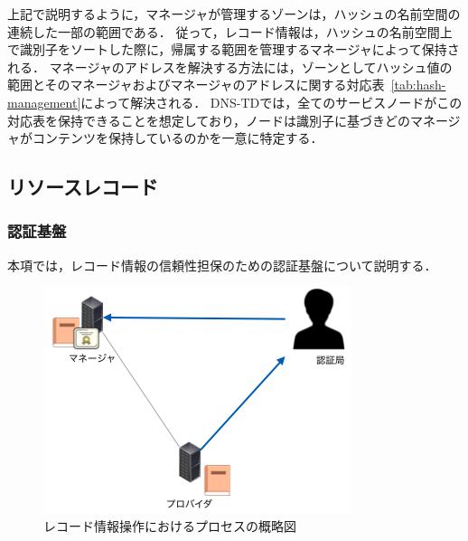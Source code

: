 上記で説明するように，マネージャが管理するゾーンは，ハッシュの名前空間の連続した一部の範囲である．
従って，レコード情報は，ハッシュの名前空間上で識別子をソートした際に，帰属する範囲を管理するマネージャによって保持される．
マネージャのアドレスを解決する方法には，ゾーンとしてハッシュ値の範囲とそのマネージャおよびマネージャのアドレスに関する対応表~\ref{tab:hash-management}によって解決される．
DNS-TDでは，全てのサービスノードがこの対応表を保持できることを想定しており，ノードは識別子に基づきどのマネージャがコンテンツを保持しているのかを一意に特定する．


\newpage
\subsection{リソースレコード}
\subsubsection{認証基盤}
\label{sec:certificate}
本項では，レコード情報の信頼性担保のための認証基盤について説明する．
\begin{figure}[h]
 \centering
 \includegraphics[scale=0.7]{figure/certificate-procedure.png}
 \caption{レコード情報操作におけるプロセスの概略図}
 \label{fig:manager-provider}
\end{figure}

